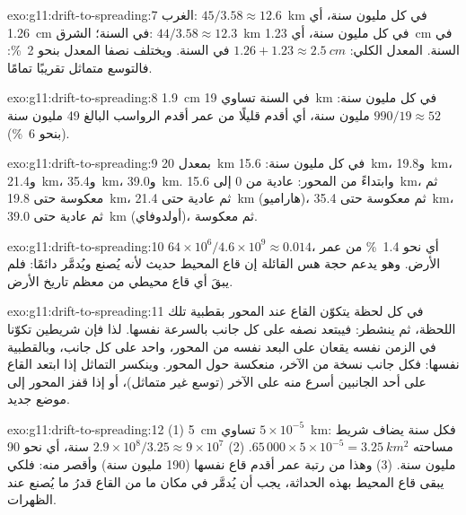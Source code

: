 \begin{solution}{exo:g11:drift-to-spreading:7}
الغرب: $45/3.58 \approx 12.6$~\unit{km} في كل مليون سنة، أي \qty{1.26}{cm} في السنة؛
الشرق: $44/3.58 \approx 12.3$~\unit{km} في كل مليون سنة، أي \qty{1.23}{cm} في السنة.
المعدل الكلي: $1.26 + 1.23 \approx \qty{2.5}{cm}$ في السنة. ويختلف نصفا المعدل
بنحو \qty{2}{\percent}: فالتوسع متماثل تقريبًا تمامًا.
\end{solution}

\begin{solution}{exo:g11:drift-to-spreading:8}
\qty{1.9}{cm} في السنة تساوي \qty{19}{km} في كل مليون سنة: $990/19 \approx 52$
مليون سنة، أي أقدم قليلًا من عمر أقدم الرواسب البالغ 49 مليون سنة
(بنحو \qty{6}{\percent}).
\end{solution}

\begin{solution}{exo:g11:drift-to-spreading:9}
بمعدل \qty{20}{km} في كل مليون سنة: \qty{15.6}{km}، و\qty{19.8}{km}،
و\qty{21.4}{km}، و\qty{35.4}{km}، و\qty{39.0}{km}. وابتداءً من المحور: عادية من 0
إلى \qty{15.6}{km}، ثم معكوسة حتى \qty{19.8}{km}، ثم عادية حتى \qty{21.4}{km}
(هاراميو)، ثم معكوسة حتى \qty{35.4}{km}، ثم عادية حتى \qty{39.0}{km} (أولدوفاي)،
ثم معكوسة.
\end{solution}

\begin{solution}{exo:g11:drift-to-spreading:10}
$64 \times 10^6/4.6 \times 10^9 \approx \num{0.014}$، أي نحو
\qty{1.4}{\percent} من عمر الأرض. وهو يدعم حجة هس القائلة إن
قاع المحيط حديث لأنه يُصنع ويُدمَّر دائمًا: فلم يبقَ أي
قاع محيطي من معظم تاريخ الأرض.
\end{solution}

\begin{solution}{exo:g11:drift-to-spreading:11}
في كل لحظة يتكوّن القاع عند المحور بقطبية تلك اللحظة،
ثم ينشطر: فيبتعد نصفه على كل جانب بالسرعة نفسها. لذا فإن شريطين تكوّنا
في الزمن نفسه يقعان على البعد نفسه من المحور، واحد على كل
جانب، وبالقطبية نفسها: فكل جانب نسخة من الآخر، منعكسة حول
المحور. وينكسر التماثل إذا ابتعد القاع على أحد الجانبين أسرع منه
على الآخر (توسع غير متماثل)، أو إذا قفز المحور إلى
موضع جديد.
\end{solution}

\begin{solution}{exo:g11:drift-to-spreading:12}
(1) \qty{5}{cm} تساوي $5 \times 10^{-5}$~\unit{km}: فكل سنة يضاف شريط مساحته
$65\,000 \times 5 \times 10^{-5} = \qty{3.25}{km^2}$.
(2) $2.9 \times 10^8/3.25 \approx 9 \times 10^7$ سنة، أي نحو 90 مليون
سنة. (3) وهذا من رتبة عمر أقدم قاع نفسها
(190 مليون سنة) وأقصر منه: فلكي يبقى قاع المحيط بهذه
الحداثة، يجب أن يُدمَّر في مكان ما من القاع قدرُ ما يُصنع عند الظهرات.
\end{solution}

